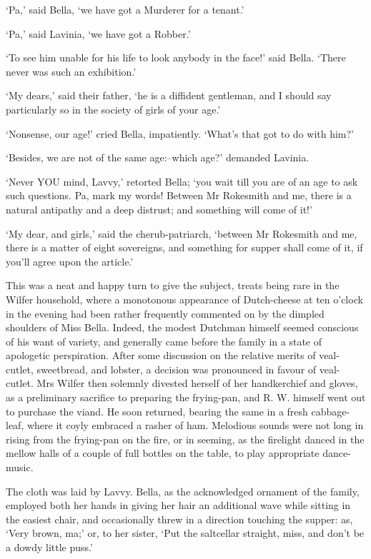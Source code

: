 ‘Pa,’ said Bella, ‘we have got a Murderer for a tenant.’

‘Pa,’ said Lavinia, ‘we have got a Robber.’

‘To see him unable for his life to look anybody in the face!’ said
Bella. ‘There never was such an exhibition.’

‘My dears,’ said their father, ‘he is a diffident gentleman, and I
should say particularly so in the society of girls of your age.’

‘Nonsense, our age!’ cried Bella, impatiently. ‘What’s that got to do
with him?’

‘Besides, we are not of the same age:--which age?’ demanded Lavinia.

‘Never YOU mind, Lavvy,’ retorted Bella; ‘you wait till you are of an
age to ask such questions. Pa, mark my words! Between Mr Rokesmith and
me, there is a natural antipathy and a deep distrust; and something will
come of it!’

‘My dear, and girls,’ said the cherub-patriarch, ‘between Mr Rokesmith
and me, there is a matter of eight sovereigns, and something for supper
shall come of it, if you’ll agree upon the article.’

This was a neat and happy turn to give the subject, treats being rare in
the Wilfer household, where a monotonous appearance of Dutch-cheese at
ten o’clock in the evening had been rather frequently commented on by
the dimpled shoulders of Miss Bella. Indeed, the modest Dutchman himself
seemed conscious of his want of variety, and generally came before the
family in a state of apologetic perspiration. After some discussion on
the relative merits of veal-cutlet, sweetbread, and lobster, a decision
was pronounced in favour of veal-cutlet. Mrs Wilfer then solemnly
divested herself of her handkerchief and gloves, as a preliminary
sacrifice to preparing the frying-pan, and R. W. himself went out
to purchase the viand. He soon returned, bearing the same in a fresh
cabbage-leaf, where it coyly embraced a rasher of ham. Melodious sounds
were not long in rising from the frying-pan on the fire, or in seeming,
as the firelight danced in the mellow halls of a couple of full bottles
on the table, to play appropriate dance-music.

The cloth was laid by Lavvy. Bella, as the acknowledged ornament of the
family, employed both her hands in giving her hair an additional
wave while sitting in the easiest chair, and occasionally threw in a
direction touching the supper: as, ‘Very brown, ma;’ or, to her sister,
‘Put the saltcellar straight, miss, and don’t be a dowdy little puss.’

